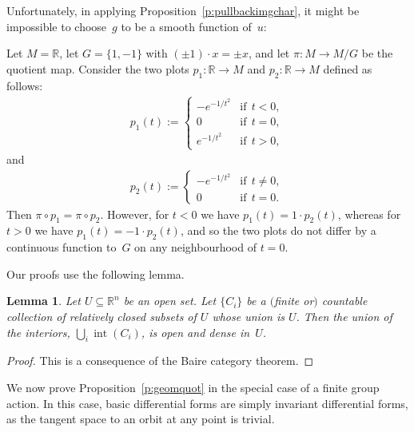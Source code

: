 \documentclass[11pt]{article}
\numberwithin{equation}{section}
\newtheorem{Lemma}[Theorem]{Lemma}
\newcommand{\RR}{{\mathbb{R}}} %
\newcommand{\ZZ}{{\mathbb{Z}}} %
\newcommand{\inter}{{\operatorname{int}}} %
\newcommand{\hypref}[2]{{#2~\ref{#1}}}
\begin{document}
Unfortunately, in applying \hypref{p:pullbackimgchar}{Proposition},
it might be impossible to choose~$g$
to be a smooth function of~$u$:

\begin{Example}[$\ZZ_2\circlearrowright\RR$]
\label{x:plots differ nonsmoothly}
Let $M=\RR$, let $G = \{ 1, -1 \}$ with $(\pm1) \cdot x = \pm x$,
and let $\pi \colon M \to M/G$ be the quotient map.
Consider the two plots
$p_1 \colon \RR\to M$ and $p_2 \colon \RR\to M$
def\/ined as follows:
\begin{gather*} p_1(t) := \begin{cases} -e^{-1/t^2}  & \text{if} \ \ t<0, \\
 0  & \text{if} \ \ t=0, \\
 e^{-1/t^2}  & \text{if} \ \ t>0,
\end{cases}\end{gather*}
and
\begin{gather*} p_2(t):= \begin{cases} -e^{-1/t^2}  & \text{if} \ \ t\neq 0, \\
 0  & \text{if} \ \ t=0.
\end{cases}\end{gather*}
Then $\pi \circ p_1 = \pi \circ p_2$.
However, for $t<0$ we have $p_1(t)=1\cdot p_2(t)$,
whereas for $t>0$ we have $p_1(t)=-1\cdot p_2(t)$,
and so the two plots
do not dif\/fer by a continuous function to~$G$
on any neighbourhood of $t=0$.
\end{Example}

Our proofs use the following lemma.

\begin{Lemma}\label{l:baire}
Let $U \subseteq \RR^n$ be an open set.
Let $\{ C_i \}$ be a $($finite or$)$ countable collection
of relatively closed subsets of $U$ whose union is $U$.
Then the union of the interiors, $\bigcup_i \inter(C_i)$,
is open and dense in~$U$.
\end{Lemma}

\begin{proof}
This is a consequence of the Baire category theorem.
\end{proof}


We now prove Proposition~\ref{p:geomquot} in the special case of a f\/inite group action. In this case, basic dif\/ferential forms are simply invariant dif\/ferential forms, as the tangent space to an orbit at any point is trivial.
\end{document}
